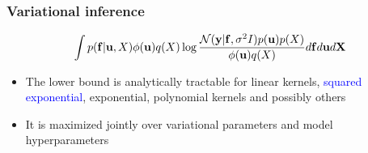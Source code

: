 \documentclass{beamer}
\begin{document}
\frame
{

\frametitle{Variational inference}

$$
\int p(\mathbf{f}|\mathbf{u}, X) \phi(\mathbf{u}) q(X)  
\log \frac{\mathcal{N}(\mathbf{y}|\mathbf{f},\sigma^2 I) p(\mathbf{u}) p(X)}
{\phi(\mathbf{u}) q(X)} d \mathbf{f} d \mathbf{u} d \mathbf{X}
$$

\begin{itemize} 


\item The lower bound is analytically tractable for
  linear kernels, \textcolor{blue}{squared exponential}, exponential, polynomial kernels
  and possibly others

\item It is maximized jointly over 
variational parameters and model hyperparameters

\end{itemize}

%
%
%
%
%
%
%
%
%
 

}
\end{document}
